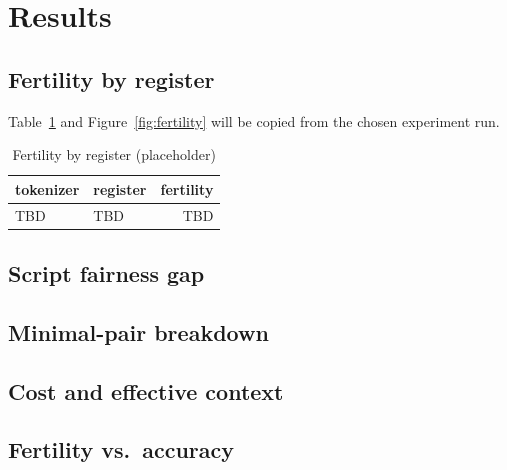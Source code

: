 \section{Results}


\subsection{Fertility by register}

Table~\ref{tab:fertility} and Figure~\ref{fig:fertility} will be copied from
the chosen experiment run.

\begin{table}[h]
  \centering
  \caption{Fertility by register (placeholder)}
  \label{tab:fertility}
  \begin{tabular}{llr}
    \toprule
    tokenizer & register & fertility \\
    \midrule
    TBD & TBD & TBD \\
    \bottomrule
  \end{tabular}
\end{table}

\subsection{Script fairness gap}


\subsection{Minimal-pair breakdown}

\subsection{Cost and effective context}

\subsection{Fertility vs.\ accuracy}
